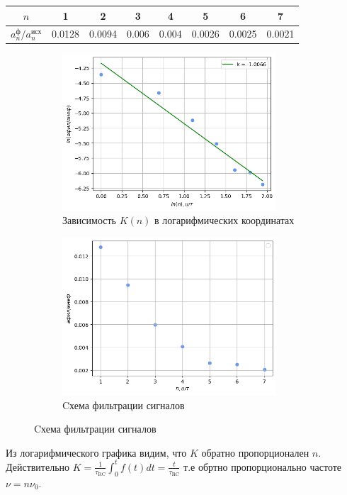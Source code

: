 \begin{table}[h!]
    \centering
    \begin{tabular}{|c|c|c|c|c|c|c|c|}
        \hline
        $n$ & 1 & 2 & 3 & 4 & 5 & 6 & 7\\\hline
        $a_n^{\text{ф}}/a_n^{\text{исх}}$ & 0.0128& 0.0094& 0.006& 0.004& 0.0026& 0.0025& 0.0021\\\hline
    \end{tabular}
\end{table}

\begin{figure}[!h]
\begin{subfigure}[b]{0.48\linewidth}
    \centering
    \includegraphics[width=8cm]{plot5.png}
    \caption{Зависимость $K(n)$ в логарифмических координатах}
\end{subfigure}
\hfill
\begin{subfigure}[b]{0.48\linewidth}
    \centering
    \includegraphics[width=8cm]{plot4.png}
    \caption{Cхема фильтрации сигналов}
\end{subfigure}
\end{figure}
Из логарифмического графика видим, что $K$ обратно пропорционален $n$. Действительно $K = \frac{1}{\tau_{\text{RC}}}\int_{0}^{t} f(t)dt = \frac{t}{\tau_{\text{RC}}}$ т.е обртно пропорционально частоте $\nu = n\nu_0$.
\newpage
